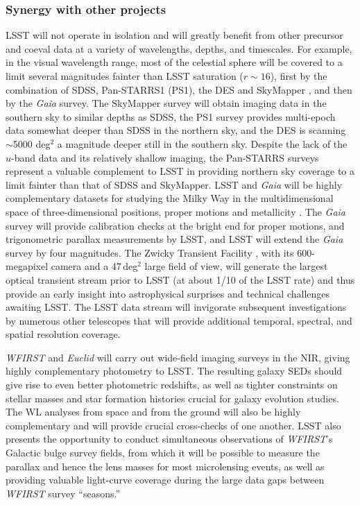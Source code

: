 \subsubsection{Synergy with other projects}

LSST will not operate in isolation and will greatly benefit from other precursor and coeval
data at a variety of wavelengths, depths, and timescales. For example,
in the visual wavelength range, most of the celestial
sphere will be covered to a limit several magnitudes fainter than LSST saturation
($r\sim16$), first by the combination of SDSS, Pan-STARRS1 (PS1), the
DES \citep{2016MNRAS.460.1270D} and SkyMapper
\citep{2007PASA...24....1K},
and then by the \textit{Gaia} survey. The SkyMapper survey will obtain imaging data in the southern
sky to similar depths as SDSS, the PS1 survey provides multi-epoch
data somewhat deeper
than SDSS in the northern sky, and the DES
 is scanning
$\sim$5000 deg$^2$ a magnitude deeper still in the southern sky. Despite the lack of
the $u$-band data and its relatively shallow imaging, the Pan-STARRS surveys
represent a valuable complement to LSST in providing northern sky coverage to a limit
fainter than that of SDSS and SkyMapper. LSST and \textit{Gaia} will
be highly complementary datasets for studying the Milky Way in the multidimensional space of
three-dimensional positions, proper motions and metallicity \citep{2012ARA&A..50..251I}.
The \textit{Gaia} survey will provide calibration checks at the bright end for proper
motions, and trigonometric parallax measurements by LSST, and LSST will extend the
\textit{Gaia} survey by four magnitudes. The Zwicky Transient Facility \cite[e.g.,][]{2018RTSRE...1..329L},
with its 600-megapixel camera and a 47\,deg$^2$ large field of view, will generate the largest
optical transient stream prior to LSST (at about 1/10 of the LSST rate) and thus provide
an early insight into astrophysical surprises and technical challenges awaiting LSST.
The LSST data stream will invigorate subsequent investigations by numerous other telescopes
that will provide additional temporal, spectral, and spatial resolution coverage.

\textit{WFIRST} and \textit{Euclid} will carry out wide-field imaging surveys in the
NIR, giving highly complementary photometry to LSST.  The
resulting galaxy SEDs should give rise to even better photometric
redshifts, as well as tighter constraints on stellar masses and star
formation histories crucial for galaxy evolution studies.  The WL
analyses from space and from the ground will also be highly
complementary and will provide crucial cross-checks of one another.
LSST also presents the opportunity to conduct simultaneous observations
of \textit{WFIRST}'s Galactic bulge survey fields, from which it will be possible to
measure the parallax and hence the lens masses for most microlensing
events, as well as providing valuable light-curve coverage during the large
data gaps between \textit{WFIRST} survey ``seasons.''

